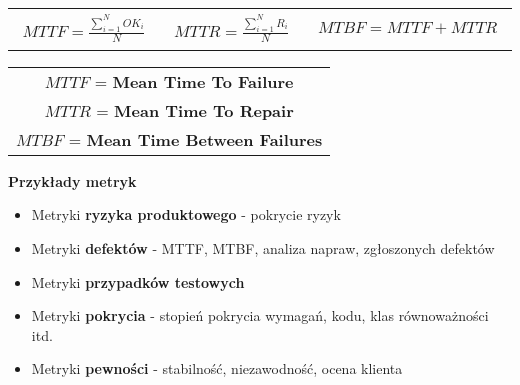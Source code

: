 \documentclass[../main.tex]{subfiles}
\begin{document}
    \begin{table}[H]
        \begin{center}
            \begin{tabular}{p{5cm} p{5cm} p{5cm}}
                \begin{align*}
                    MTTF = \frac{\sum_{i=1}^{N} OK_i}{N}
                \end{align*}
                &
                \begin{align*}
                    MTTR = \frac{\sum_{i=1}^{N} R_i}{N}
                \end{align*}
                &
                \begin{align*}
                    MTBF = MTTF + MTTR
                \end{align*}
            \end{tabular}
        \end{center}
    \end{table}

    \begin{table}[H]
        \begin{center}
            \begin{tabular}{c}

                $MTTF$ = \textbf{Mean Time To Failure}\\

                $MTTR$ = \textbf{Mean Time To Repair}\\

                $MTBF$ = \textbf{Mean Time Between Failures}\\

            \end{tabular}
        \end{center}
    \end{table}

    \textbf{Przykłady metryk}
    \begin{itemize}
        \item Metryki \textbf{ryzyka produktowego} - pokrycie ryzyk
        \item Metryki \textbf{defektów} - MTTF, MTBF, analiza napraw, zgłoszonych defektów
        \item Metryki \textbf{przypadków testowych}
        \item Metryki \textbf{pokrycia} - stopień pokrycia wymagań, kodu, klas równoważności itd.
        \item Metryki \textbf{pewności} - stabilność, niezawodność, ocena klienta
    \end{itemize}
\end{document}
